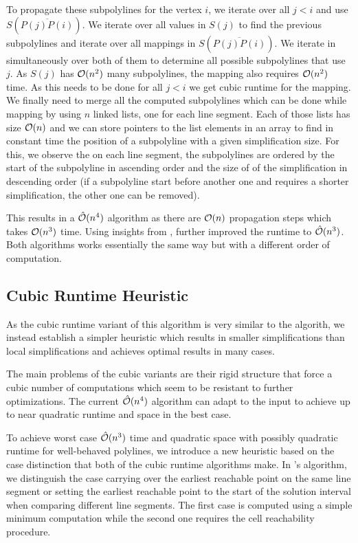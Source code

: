 To propagate these subpolylines for the vertex \(i\), we iterate over all \(j < i\) and use \(S(\overline{P(j)P(i)})\). We iterate over all values in \(S(j)\) to find the previous subpolylines and iterate over all mappings in \(S(\overline{P(j)P(i)})\). We iterate in simultaneously over both of them to determine all possible subpolylines that use \(j\). As \(S(j)\) has \(\mathcal{O}(n^2)\) many subpolylines, the mapping also requires \(\mathcal{O}(n^2)\) time. As this needs to be done for all \(j < i\) we get cubic runtime for the mapping. We finally need to merge all the computed subpolylines which can be done while mapping by using \(n\) linked lists, one for each line segment. Each of those lists has size \(\mathcal{O}(n)\) and we can store pointers to the list elements in an array to find in constant time the position of a subpolyline with a given simplification size. For this, we observe the on each line segment, the subpolylines are ordered by the start of the subpolyline in ascending order and the size of of the simplification in descending order (if a subpolyline start before another one and requires a shorter simplification, the other one can be removed).

This results in a \(\hat{\mathcal{O}}(n^4)\) algorithm as there are \(\mathcal{O}(n)\) propagation steps which takes \(\mathcal{O}(n^3)\) time. Using insights from \citeauthor{polyline_simplification_has_cubic_complexity_bringmannetal}, \citeauthor{global_curve_simplification} further improved the runtime to \(\hat{\mathcal{O}}(n^3)\). Both algorithms works essentially the same way but with a different order of computation.

\subsection{Cubic Runtime Heuristic}
As the cubic runtime variant of this algorithm is very similar to the \citeauthor{polyline_simplification_has_cubic_complexity_bringmannetal} algorith, we instead establish a simpler heuristic which results in smaller simplifications than local simplifications and achieves optimal results in many cases.

The main problems of the cubic variants are their rigid structure that force a cubic number of computations which seem to be resistant to further optimizations. The current \(\hat{\mathcal{O}}(n^4)\) algorithm can adapt to the input to achieve up to near quadratic runtime and space in the best case.

To achieve worst case \(\hat{\mathcal{O}}(n^3)\) time and quadratic space with possibly quadratic runtime for well-behaved polylines, we introduce a new heuristic based on the case distinction that both of the cubic runtime algorithms make. In \citeauthor{polyline_simplification_has_cubic_complexity_bringmannetal}'s algorithm, we distinguish the case carrying over the earliest reachable point on the same line segment or setting the earliest reachable point to the start of the solution interval when comparing different line segments. The first case is computed using a simple minimum computation while the second one requires the cell reachability procedure.

